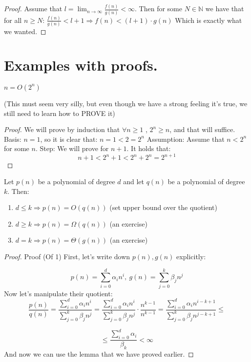 \begin{proof} Assume that \(l = \lim_{n \rightarrow \infty} \frac{f(n)}{g(n)} < \infty\). Then for some \(N \in \mathbb{N}\) we have that for all \(n \ge N\):
\( \frac{f(n)}{g(n)} < l + 1 \Rightarrow f(n) < (l + 1) · g(n) \)
Which is exactly what we wanted.
\end{proof}
\section{Examples with proofs.}

\begin{claim} \(n = O(2^n)\)
\end{claim}
(This must seem very silly, but even though we have a strong feeling it’s true, we still need to learn how to PROVE it)
\begin{proof} We will prove by induction that \( \forall n \ge 1 \) , \(2^n \ge n\), and that will suffice.
Basis: \(n = 1\), so it is clear that: \(n = 1 < 2 = 2^n\)
Assumption: Assume that \(n < 2^n\) for some \(n\).
Step: We will prove for \(n + 1\). It holds that:
\begin{equation*}
n + 1 < 2^{n} + 1 < 2^n + 2^n = 2^{n+1}
\end{equation*}
\end{proof}
\begin{claim}
Let $p(n)$ be a polynomial of degree $d$ and let $q(n)$ be a polynomial
of degree $k$. Then:
\begin{enumerate}
\item $d\leq k\Rightarrow p(n)=O(q(n))$ (set upper bound over the quotient)
\item $d\geq k\Rightarrow p(n)=\Omega(q(n))$ (an exercise)
\item $d=k\Rightarrow p(n)=\Theta(g(n))$ (an exercise)
\end{enumerate}
\end{claim}
\begin{proof}Proof (Of 1) First, let's write down $p(n), g(n)$ explicitly:


\[
p(n)=\sum_{i=0}^{d}\alpha_{i}n^{i},\ g(n)=\sum_{j=0}^{k}\beta_{j}n^{j}
\]
Now let's manipulate their quotient:
\[
\frac{p(n)}{q(n)}=\frac{\sum_{i=0}^{d}\alpha_{i}n^{i}}{\sum_{j=0}^{k}\beta_{j}n^{j}}=\frac{\sum_{i=0}^{d}\alpha_{i}n^{i}}{\sum_{j=0}^{k}\beta_{j}n^{j}}\cdot\frac{n^{k-1}}{n^{k-1}}=\frac{\sum_{i=0}^{d}\alpha_{i}n^{i-k+1}}{\sum_{j=0}^{k}\beta_{j}n^{j-k+1}}\leq
\]

\[
\leq\frac{\sum_{i=0}^{d}\alpha_{i}}{\beta_{k}} < \infty
\]
And now we can use the lemma that we have proved earlier. 
\end{proof}

